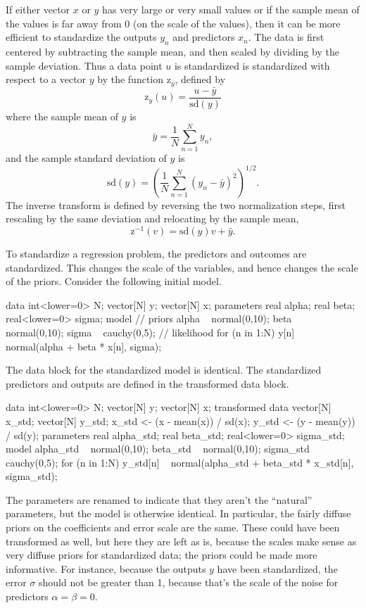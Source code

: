 If either vector $x$ or $y$ has very large or very small values or if the
sample mean of the values is far away from 0 (on the scale of the values),
then it can be more efficient to standardize the outputs $y_n$ and
predictors $x_n$.  The data is first centered by subtracting the
sample mean, and then scaled by dividing by the sample deviation.
Thus a data point $u$ is standardized is standardized with respect to
a vector $y$  by the function $\mbox{z}_y$, defined by
\[
\mbox{z}_y(u) = \frac{u - \bar{y}}{\mbox{sd}(y)}
\]
where the sample mean of $y$ is
\[
\bar{y}
= \frac{1}{N} \sum_{n=1}^N y_n,
\]
and the sample standard deviation of $y$ is
\[
\mbox{sd}(y) 
= \left( 
\frac{1}{N} \sum_{n=1}^N (y_n - \bar{y})^2
\right)^{1/2}.
\]
The inverse transform is
defined by reversing the two normalization steps, first rescaling by
the same deviation and relocating by the sample mean,
\[
\mbox{z}^{-1}(v) = \mbox{sd}(y) v + \bar{y}.
\]

To standardize a regression problem, the predictors and outcomes are
standardized.  This changes the scale of the variables, and hence
changes the scale of the priors.  Consider the following initial
model.
%
\begin{stancode}
data {
  int<lower=0> N;
  vector[N] y;
  vector[N] x;
}
parameters {
  real alpha;
  real beta;
  real<lower=0> sigma;
}
model {
  // priors
  alpha ~ normal(0,10);    
  beta ~ normal(0,10);
  sigma ~ cauchy(0,5);
  // likelihood
  for (n in 1:N)
    y[n] ~ normal(alpha + beta * x[n], sigma);
}
\end{stancode}
%

The data block for the standardized model is identical.  The
standardized predictors and outputs are defined in the transformed
data block.  
%
\begin{stancode}
data {
  int<lower=0> N;
  vector[N] y;
  vector[N] x;
}
transformed data {
  vector[N] x_std;
  vector[N] y_std;
  x_std <- (x - mean(x)) / sd(x);
  y_std <- (y - mean(y)) / sd(y);
}
parameters {
  real alpha_std;
  real beta_std;
  real<lower=0> sigma_std;
}
model {
  alpha_std ~ normal(0,10);    
  beta_std ~ normal(0,10);
  sigma_std ~ cauchy(0,5);
  for (n in 1:N)
    y_std[n] ~ normal(alpha_std + beta_std * x_std[n], 
                      sigma_std);
}
\end{stancode}
%
The parameters are renamed to indicate that they aren't the
``natural'' parameters, but the model is otherwise identical.  In
particular, the fairly diffuse priors on the coefficients and error
scale are the same.  These could have been transformed as well, but
here they are left as is, because the scales make sense as very
diffuse priors for standardized data; the priors could be made more
informative.  For instance, because the outputs $y$ have been
standardized, the error $\sigma$ should not be greater than 1, because
that's the scale of the noise for predictors $\alpha = \beta = 0$.

